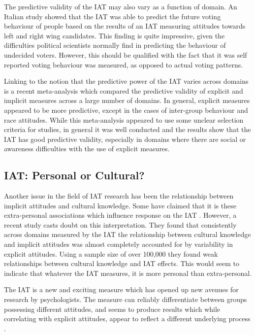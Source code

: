 The predictive validity of the IAT may also vary as a function of domain. An Italian study \cite{Arcuri2008} showed that the IAT was able to predict the future voting behaviour of people based on the results of an IAT measuring attitudes towards left and right wing candidates. This finding is quite impressive, given the difficulties political scientists normally find in predicting the behaviour of undecided voters. However, this should be qualified with the fact that it was self reported voting behaviour was measured, as opposed to actual voting patterns. 

Linking to the notion that the predictive power of the IAT varies across domains is a recent meta-analysis \cite{Greenwald2009} which compared the predictive validity of explicit and implicit measures across a large number of domains. In general, explicit measures appeared to be more predictive, except in the cases of inter-group behaviour and race attitudes. While this meta-analysis appeared to use some unclear selection criteria for studies, in general it was well conducted and the results show that the IAT has good predictive validity, especially in domains where there are social or awareness difficulties with the use of explicit measures. 

\subsection{IAT: Personal or Cultural?}
\label{sec:iat:-personal-or}


Another issue in the field of IAT research has been the relationship between implicit attitudes and cultural knowledge. Some have claimed that it is these extra-personal associations which influence response on the IAT \cite{Olson2004}. However, a recent study \cite{Nosek2007a} casts doubt on this interpretation. They found that consistently across domains measured by the IAT the relationship between cultural knowledge and implicit attitudes was almost completely accounted for by variability in explicit attitudes. Using a sample size of over 100,000 they found weak relationships between cultural knowledge and IAT effects. This would seem to indicate that whatever the IAT measures, it is more personal than extra-personal. 

The IAT is a new and exciting measure which has opened up new avenues for research by psychologists.   The measure can reliably differentiate between groups possessing different attitudes, and seems to produce results which while correlating with explicit attitudes, appear to reflect a different underlying process \cite{Nosek2007a}. 

